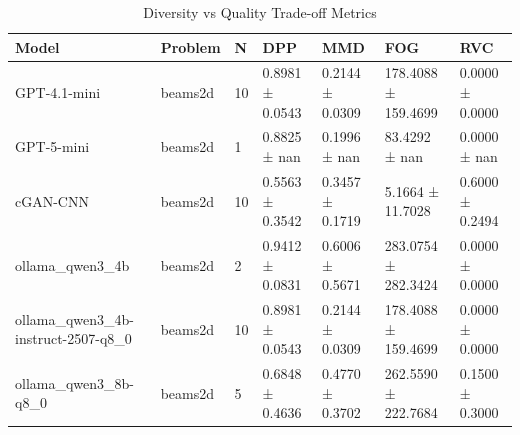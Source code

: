 \begin{table}
\caption{Diversity vs Quality Trade-off Metrics}
\label{tab:diversity_quality}
\begin{tabular}{lllllll}
\toprule
Model & Problem & N & DPP & MMD & FOG & RVC \\
\midrule
GPT-4.1-mini & beams2d & 10 & 0.8981 ± 0.0543 & 0.2144 ± 0.0309 & 178.4088 ± 159.4699 & 0.0000 ± 0.0000 \\
GPT-5-mini & beams2d & 1 & 0.8825 ± nan & 0.1996 ± nan & 83.4292 ± nan & 0.0000 ± nan \\
cGAN-CNN & beams2d & 10 & 0.5563 ± 0.3542 & 0.3457 ± 0.1719 & 5.1664 ± 11.7028 & 0.6000 ± 0.2494 \\
ollama_qwen3_4b & beams2d & 2 & 0.9412 ± 0.0831 & 0.6006 ± 0.5671 & 283.0754 ± 282.3424 & 0.0000 ± 0.0000 \\
ollama_qwen3_4b-instruct-2507-q8_0 & beams2d & 10 & 0.8981 ± 0.0543 & 0.2144 ± 0.0309 & 178.4088 ± 159.4699 & 0.0000 ± 0.0000 \\
ollama_qwen3_8b-q8_0 & beams2d & 5 & 0.6848 ± 0.4636 & 0.4770 ± 0.3702 & 262.5590 ± 222.7684 & 0.1500 ± 0.3000 \\
\bottomrule
\end{tabular}
\end{table}
